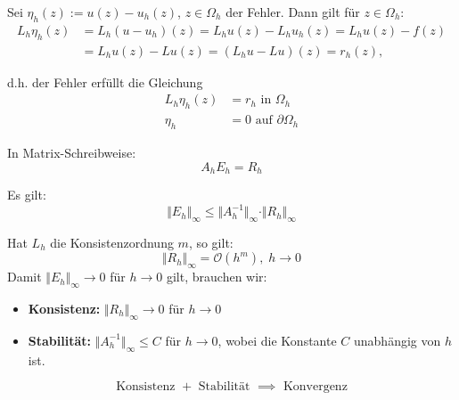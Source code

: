 \begin{bem}
Sei $\eta_h (z) := u(z) - u_h(z)$, $z \in \Omega_h$ der Fehler.
Dann gilt für $z \in \Omega_h$:
\begin{align*}
L_h \eta_h (z)
    &= L_h (u - u_h) (z)
    = L_h u (z) - L_h u_h(z)
    = L_h u(z) - f(z) \\
    &= L_h u(z) - L u(z)
    = (L_h u - L u)(z)
    = r_h(z) ,
\end{align*}
\end{bem}
d.h. der Fehler erfüllt die Gleichung
\begin{align*}
L_h \eta_h(z) &= r_h \text{ in } \Omega_h \\
\eta_h &= 0 \text{ auf } \partial \Omega_h
\end{align*}

In Matrix-Schreibweise:
\[
A_h E_h = R_h
\]

Es gilt:
\[
\Vert E_h \Vert_\infty \leq \Vert A_h^{-1} \Vert_\infty \cdot \Vert R_h \Vert_\infty
\]

\begin{bem}
Hat $L_h$ die Konsistenzordnung $m$, so gilt:
\[
\Vert R_h \Vert_\infty = \mathcal O(h^m), \; h \to 0
\]
Damit $\Vert E_h \Vert_\infty \to 0$ für $h \to 0$ gilt, brauchen wir:
\begin{itemize}
\item \textbf{Konsistenz:} $\Vert R_h \Vert_\infty \to 0$ für $h \to 0$
\item \textbf{Stabilität:} $\Vert A_h^{-1} \Vert_\infty \leq C$ für $h \to 0$, wobei die Konstante
$C$ unabhängig von $h$ ist.
\end{itemize}
\[
\text{Konsistenz } + \text{ Stabilität } \implies \text{ Konvergenz}
\]
\end{bem}

